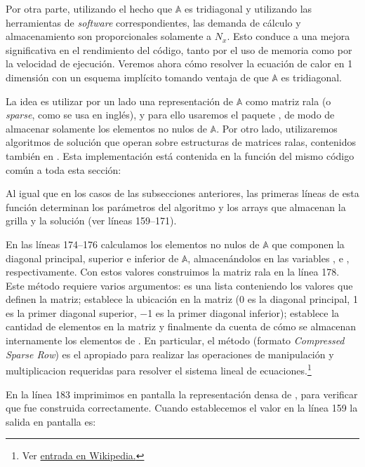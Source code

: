 Por otra parte, utilizando el hecho que $\mathbb{A}$ es tridiagonal y utilizando las herramientas de \textit{software} correspondientes, las demanda de cálculo y almacenamiento son proporcionales solamente a $N_x$. Esto conduce a una mejora significativa en el rendimiento del código, tanto por el uso de memoria como por la velocidad de ejecución. Veremos ahora cómo resolver la ecuación de calor en 1 dimensión con un esquema implícito tomando ventaja de que $\mathbb{A}$ es tridiagonal.

La idea es utilizar por un lado una representación de $\mathbb{A}$ como matriz rala (o \textit{sparse}, como se usa en inglés), y para ello usaremos el paquete , de modo de almacenar solamente los elementos no nulos de $\mathbb{A}$. Por otro lado, utilizaremos algoritmos de solución que operan sobre estructuras de matrices ralas, contenidos también en . Esta implementación está contenida en la función  del mismo código común a toda esta sección:


Al igual que en los casos de las subsecciones anteriores, las primeras líneas de esta función determinan los parámetros del algoritmo y los arrays que almacenan la grilla y la solución (ver líneas 159--171).

En las líneas 174--176 calculamos los elementos no nulos de $\mathbb{A}$ que componen la diagonal principal, superior e inferior de $\mathbb{A}$, almacenándolos en las variables ,  e , respectivamente. Con estos valores construimos la matriz rala  en la línea 178. Este método requiere varios argumentos:  es una lista conteniendo los valores que definen la matriz;  establece la ubicación en la matriz (0 es la diagonal principal, 1 es la primer diagonal superior, $-$1 es la primer diagonal inferior);  establece la cantidad de elementos en la matriz y finalmente  da cuenta de cómo se almacenan internamente los elementos de . En particular, el método  (formato \textit{Compressed Sparse Row}) es el apropiado para realizar las operaciones de manipulación y multiplicacion requeridas para resolver el sistema lineal de ecuaciones.\footnote{Ver \href{https://en.wikipedia.org/wiki/Sparse_matrix}{entrada en Wikipedia.}}

En la línea 183 imprimimos en pantalla la representación densa de , para verificar que fue construida correctamente. Cuando establecemos el valor  en la línea 159 la salida en pantalla es:

